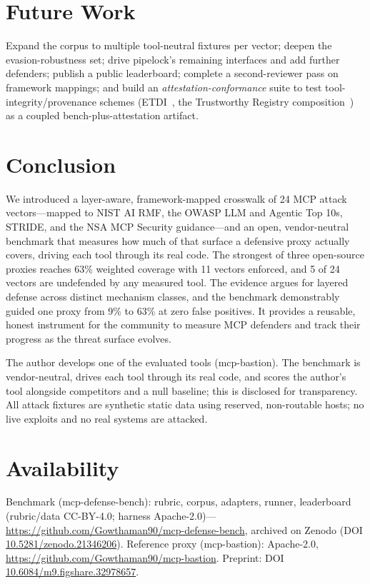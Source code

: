 \documentclass[sigconf,review]{acmart}
\begin{document}
\section{Future Work}\label{sec:future}
Expand the corpus to multiple tool-neutral fixtures per vector; deepen the evasion-robustness set; drive pipelock's remaining interfaces and add further defenders; publish a public leaderboard; complete a second-reviewer pass on framework mappings; and build an \emph{attestation-conformance} suite to test tool-integrity/provenance schemes (ETDI~\cite{etdi2506}, the Trustworthy Registry composition~\cite{trustreg2026}) as a coupled bench-plus-attestation artifact.

\section{Conclusion}
We introduced a layer-aware, framework-mapped crosswalk of 24 MCP attack vectors---mapped to NIST AI RMF, the OWASP LLM and Agentic Top 10s, STRIDE, and the NSA MCP Security guidance---and an open, vendor-neutral benchmark that measures how much of that surface a defensive proxy actually covers, driving each tool through its real code. The strongest of three open-source proxies reaches 63\% weighted coverage with 11 vectors enforced, and 5 of 24 vectors are undefended by any measured tool. The evidence argues for layered defense across distinct mechanism classes, and the benchmark demonstrably guided one proxy from 9\% to 63\% at zero false positives. It provides a reusable, honest instrument for the community to measure MCP defenders and track their progress as the threat surface evolves.

\begin{acks}
The author develops one of the evaluated tools (mcp-bastion). The benchmark is vendor-neutral, drives each tool through its real code, and scores the author's tool alongside competitors and a null baseline; this is disclosed for transparency. All attack fixtures are synthetic static data using reserved, non-routable hosts; no live exploits and no real systems are attacked.
\end{acks}

\section*{Availability}
Benchmark (mcp-defense-bench): rubric, corpus, adapters, runner, leaderboard (rubric/data CC-BY-4.0; harness Apache-2.0)---\url{https://github.com/Gowthaman90/mcp-defense-bench}, archived on Zenodo (DOI \href{https://doi.org/10.5281/zenodo.21346206}{10.5281/zenodo.21346206}). Reference proxy (mcp-bastion): Apache-2.0, \url{https://github.com/Gowthaman90/mcp-bastion}. Preprint: DOI \href{https://doi.org/10.6084/m9.figshare.32978657}{10.6084/m9.figshare.32978657}.

\balance


\end{document}
